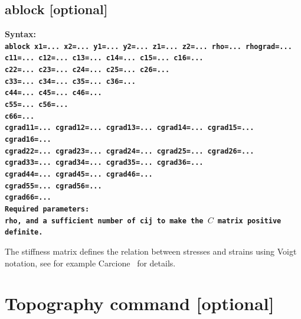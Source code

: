\documentclass[11pt]{report}
\begin{document}
\subsection{ablock [optional]}
\label{keyword:ablock}
\begin{flushleft}\bf
Syntax:\\
\tt ablock x1=... x2=... y1=... y2=... z1=... z2=... rho=... rhograd=...\\
c11=... c12=... c13=... c14=... c15=... c16=... \\ 
c22=... c23=... c24=... c25=... c26=... \\
c33=... c34=... c35=... c36=... \\
c44=... c45=... c46=... \\
c55=... c56=... \\
c66=... \\
cgrad11=... cgrad12=... cgrad13=... cgrad14=... cgrad15=... cgrad16=... \\ 
            cgrad22=... cgrad23=... cgrad24=... cgrad25=... cgrad26=... \\
                        cgrad33=... cgrad34=... cgrad35=... cgrad36=... \\
                                    cgrad44=... cgrad45=... cgrad46=... \\
                                                cgrad55=... cgrad56=... \\
                                                            cgrad66=... \\
\bf Required parameters:\\
\tt rho, \rm and a sufficient number of \tt cij \rm to make the $C$ matrix positive definite.
\end{flushleft}
The stiffness matrix defines the relation between stresses and strains using Voigt notation, see
for example Carcione~\cite{carcione-01} for details.

\section{Topography command [optional]}

\end{document}
